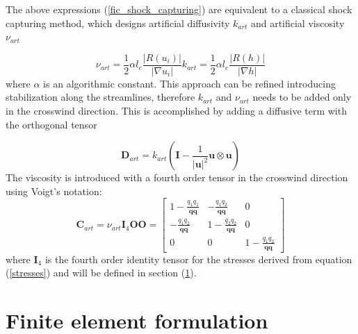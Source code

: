 \documentclass[a4paper,12pt]{article}
\newcommand{\abs}[1]{\lvert#1\rvert}
\begin{document}
The above expressions (\ref{fic_shock_capturing}) are equivalent to a classical shock capturing method, which designs artificial diffusivity $k_{art}$ and artificial viscosity $\nu_{art}$

\begin{subequations} \label{k_art}
\begin{equation}
\nu_{art} = \frac{1}{2}\alpha l_e \frac{\abs{R(u_i)}}{\abs{\nabla u_i}}
\end{equation}
\begin{equation}
k_{art} = \frac{1}{2}\alpha l_e \frac{\abs{R(h)}}{\abs{\nabla h}}
\end{equation}
\end{subequations}
where $\alpha$ is an algorithmic constant.
This approach can be refined introducing stabilization along the streamlines, therefore $k_{art}$ and $\nu_{art}$ needs to be added only in the crosswind direction. This is accomplished by adding a diffusive term with the orthogonal tensor

\begin{equation}
\mathbf{D}_{art} = k_{art}
\left( \mathbf{I} - \frac{1}{\abs{\mathbf{u}}^2} \mathbf{u} \otimes \mathbf{u} \right)
\end{equation}
The viscosity is introduced with a fourth order tensor in the crosswind direction using Voigt's notation:
\begin{subequations}
\begin{equation}
\mathbf{C}_{art} = \nu_{art} \mathbf{I}_4 \mathbf{O}
\end{equation}
\begin{equation}
\mathbf{O} = \left[\begin{matrix}
    1-\frac{q_1q_1}{\mathbf{q}\mathbf{q}} & -\frac{q_1q_2}{\mathbf{q}\mathbf{q}} & 0 \\
    -\frac{q_1q_2}{\mathbf{q}\mathbf{q}} & 1-\frac{q_2q_2}{\mathbf{q}\mathbf{q}} & 0 \\
    0 & 0 & 1-\frac{q_1q_2}{\mathbf{q}\mathbf{q}}
\end{matrix}\right]
\end{equation}
\end{subequations}
where $\mathbf{I}_4$ is the fourth order identity tensor for the stresses derived from equation (\ref{stresses}) and will be defined in section (\ref{sec:fem}).


\section{Finite element formulation} \label{sec:fem} 
\end{document}
